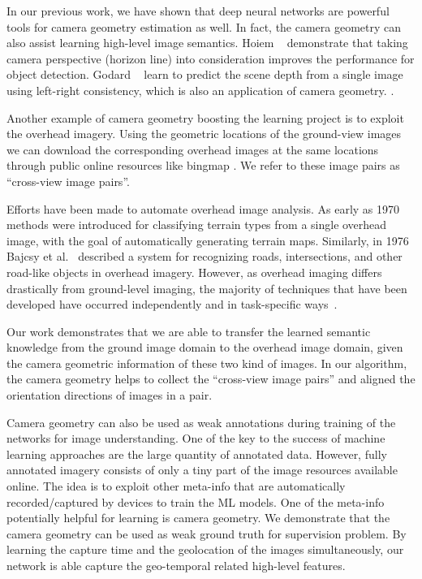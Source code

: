 In our previous work, we have shown that deep neural networks are
powerful tools for camera geometry estimation as well. In fact, the
camera geometry can also assist learning high-level image semantics.
Hoiem \etal~\cite{hoiem2008putting} demonstrate that taking camera
perspective (horizon line) into consideration improves the performance
for object detection. Godard \etal~\cite{godard2017unsupervised} learn
to predict the scene depth from a single image using left-right
consistency, which is also an application of camera geometry.
.

Another example of camera geometry boosting the learning project is to
exploit the overhead imagery. Using the geometric locations of the
ground-view images we can download the corresponding overhead images
at the same locations through public online resources like bingmap
. We refer to these image pairs as ``cross-view image
pairs''.

 Efforts have been made to
automate overhead image analysis. As early as
1970~\cite{idelsohn1970learning} methods were introduced for
classifying terrain types from a single overhead image, with the goal
of automatically generating terrain maps.  Similarly, in 1976 Bajcsy
et al.~\cite{bajcsy1976computer} described a system for recognizing
roads, intersections, and other road-like objects in overhead imagery.
However, as overhead imaging differs drastically from ground-level
imaging, the majority of techniques that have been developed have
occurred independently and in task-specific ways~\cite{Rozen}.

Our work demonstrates that we are able to transfer the learned semantic
knowledge from the ground image domain to the overhead image domain,
given the camera geometric information of these two kind of images. In
our algorithm, the camera geometry helps to collect the ``cross-view
image pairs'' and aligned the orientation directions of images in a
pair.

Camera geometry can also be used as weak annotations during training
of the networks for image understanding.  One of the key to the
success of machine learning approaches are the large quantity of
annotated data. However, fully annotated imagery consists of only a
tiny part of the image resources available online. The idea is to
exploit other meta-info that are automatically recorded/captured by
devices to train the ML models. One of the meta-info potentially
helpful for learning is camera geometry.  We demonstrate that the
camera geometry can be used as weak ground truth for supervision
problem. By learning the capture time and the geolocation of the
images simultaneously, our network is able capture the geo-temporal
related high-level features.


